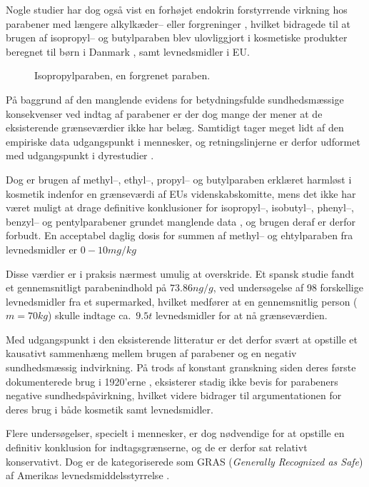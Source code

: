     Nogle studier har dog også vist en forhøjet endokrin forstyrrende virkning hos parabener med længere alkylkæder-- eller forgreninger \parencite{Ebru2013}, hvilket bidragede til at brugen af isopropyl-- og butylparaben blev ulovliggjort i kosmetiske produkter beregnet til børn i Danmark \parencite{Milj2013}, samt levnedsmidler i EU.
    \begin{figure}[H]\centering
        \caption{Isopropylparaben, en forgrenet paraben.}
    \end{figure}
    På baggrund af den manglende evidens for betydningsfulde sundhedsmæssige konsekvenser ved indtag af parabener er der dog mange der mener at de eksisterende grænseværdier \parencite{Euro2011} ikke har belæg. Samtidigt tager meget lidt af den empiriske data udgangspunkt i mennesker, og retningslinjerne er derfor udformet med udgangspunkt i dyrestudier \parencite{Emma2016}.

    Dog er brugen af methyl--, ethyl--, propyl-- og butylparaben erklæret harmløst i kosmetik indenfor en grænseværdi af EUs videnskabskomitte, mens det ikke har været muligt at drage definitive konklusioner for isopropyl--, isobutyl--, phenyl--, benzyl-- og pentylparabener grundet manglende data \parencite{Henr2013}, og brugen deraf er derfor forbudt. En acceptabel daglig dosis for summen af methyl-- og ehtylparaben fra levnedsmidler er $0-10\si{mg\per kg}$

    Disse værdier er i praksis nærmest umulig at overskride. Et spansk studie \parencite{Yola2020} fandt et gennemsnitligt parabenindhold på $73.86\si{ng\per g}$, ved undersøgelse af 98 forskellige levnedsmidler fra et supermarked, hvilket medfører at en gennemsnitlig person ($m=70\si{kg}$) skulle indtage ca.\ $9.5\si{t}$ levnedsmidler for at nå grænseværdien.
    
    Med udgangspunkt i den eksisterende litteratur er det derfor svært at opstille et kausativt sammenhæng mellem brugen af parabener og en negativ sundhedsmæssig indvirkning. På trods af konstant granskning siden deres første dokumenterede brug i 1920'erne \parencite{Mary1984}, eksisterer stadig ikke bevis for parabeners negative sundhedspåvirkning, hvilket videre bidrager til argumentationen for deres brug i både kosmetik samt levnedsmidler. 

    Flere undersøgelser, specielt i mennesker, er dog nødvendige for at opstille en definitiv konklusion for indtagsgrænserne, og de er derfor sat relativt konservativt. Dog er de kategoriserede som GRAS (\textit{Generally Recognized as Safe}) af Amerikas levnedsmiddelsstyrrelse \parencite{FDA2022}.

